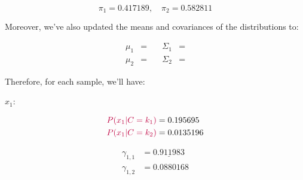 \documentclass[12pt]{article}
\begin{document}
\begin{enumerate}[leftmargin=\labelsep]
\begin{enumerate}[leftmargin=\labelsep]
                \begin{equation*}
                  \pi_1 = 0.417189, \quad
                  \pi_2 = 0.582811
                \end{equation*}

                Moreover, we've also updated the means and covariances of the distributions
                to:

                \begin{equation*}
                  \begin{aligned}
                    \mu_1 & =        \quad
                          & \Sigma_1                                             & =  \\
                    \mu_2 & =  \quad
                          & \Sigma_2                                             & = 
                  \end{aligned}
                \end{equation*}

                Therefore, for each sample, we'll have:

                \vspace*{0.5cm}

                \begin{paracol}{3}
                  \setlength{\columnseprule}{1pt}
                  \def\columnseprulecolor{\color{black}}
                  \centering

                  $x_1$:

                  \begin{normalsize}
                    \begin{equation*}
                      \begin{aligned}
                        \textcolor{purple}{P(x_1 | C = k_1)} & = 0.195695  \\
                        \textcolor{purple}{P(x_1 | C = k_2)} & = 0.0135196
                      \end{aligned}
                    \end{equation*}

                    \begin{equation*}
                      \begin{aligned}
                        \gamma_{1, 1} & = \underline{0.911983} \\
                        \gamma_{1, 2} & = 0.0880168
                      \end{aligned}
                    \end{equation*}
                  \end{normalsize}


\end{paracol}
\end{enumerate}
\end{enumerate}
\end{document}
